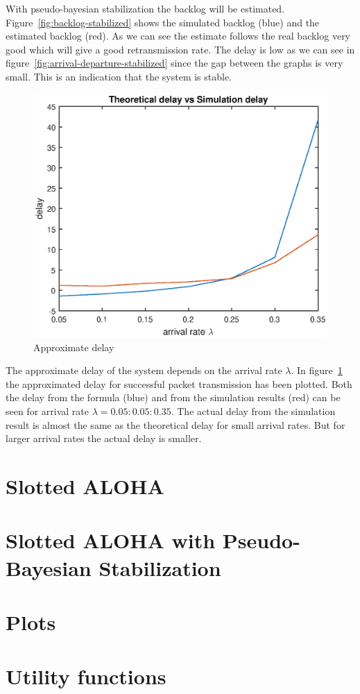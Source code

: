 \documentclass{article}
\begin{document}
With pseudo-bayesian stabilization the backlog will be estimated. Figure~\ref{fig:backlog-stabilized} shows the simulated backlog (blue) and the estimated backlog (red). As we can see the estimate follows the real backlog very good which will give a good retransmission rate. The delay is low as we can see in figure~\ref{fig:arrival-departure-stabilized} since the gap between the graphs is very small. This is an indication that the system is stable.

\begin{figure}[h]
  \centering
  \includegraphics[width=.5\textwidth]{figures/approximate-delay.eps}
  \caption{Approximate delay}
  \label{fig:approximate-delay}
\end{figure}

The approximate delay of the system depends on the arrival rate $\lambda$. In figure~\ref{fig:approximate-delay} the approximated delay for successful packet transmission has been plotted. Both the delay from the formula (blue) and from the simulation results (red) can be seen for arrival rate $\lambda = 0.05:0.05:0.35$. The actual delay from the simulation result is almost the same as the theoretical delay for small arrival rates. But for larger arrival rates the actual delay is smaller. 

\newpage
\appendix
\section{Slotted ALOHA}


\section{Slotted ALOHA with Pseudo-Bayesian Stabilization}


\section{Plots}


\section{Utility functions}


\end{document}

